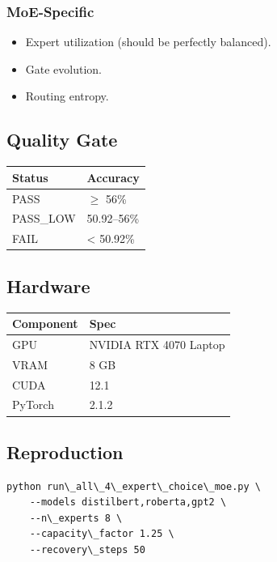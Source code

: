 \subsubsection{MoE-Specific}
\begin{itemize}
\item Expert utilization (should be perfectly balanced).
\item Gate evolution.
\item Routing entropy.

\end{itemize}
\subsection{Quality Gate}

\begin{table}[H]
\centering
\small
\begin{tabular}{ll}
\toprule
\textbf{Status} & \textbf{Accuracy} \\
\midrule
PASS & $\ge$ 56\% \\
PASS\_LOW & 50.92--56\% \\
FAIL & \textless{} 50.92\% \\
\bottomrule
\end{tabular}
\end{table}

\subsection{Hardware}

\begin{table}[H]
\centering
\small
\begin{tabular}{ll}
\toprule
\textbf{Component} & \textbf{Spec} \\
\midrule
GPU & NVIDIA RTX 4070 Laptop \\
VRAM & 8 GB \\
CUDA & 12.1 \\
PyTorch & 2.1.2 \\
\bottomrule
\end{tabular}
\end{table}

\subsection{Reproduction}

\begin{lstlisting}
python run\_all\_4\_expert\_choice\_moe.py \
    --models distilbert,roberta,gpt2 \
    --n\_experts 8 \
    --capacity\_factor 1.25 \
    --recovery\_steps 50
\end{lstlisting}

